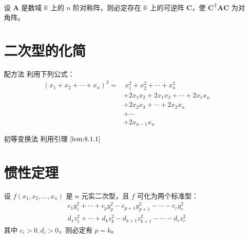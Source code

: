 \begin{theorem}
    设 $\bm{A}$ 是数域 $\mathbb{K}$ 上的 $n$ 阶对称阵，则必定存在 $\mathbb{K}$ 上的可逆阵 $\bm{C}$，使 $\bm{C}^{\mathrm{T}}\bm{AC}$ 为对角阵。
\end{theorem}



\section{二次型的化简}

\begin{proposition}{配方法}
    利用下列公式：
    \begin{align*}
        (x_1 + x_2 + \cdots + x_n)^2 = & \ x_{1}^{2} + x_{2}^{2} + \cdots + x_{n}^{2}       \\
                                       & + 2x_{1}x_{2} + 2x_{1}x_{3} + \cdots + 2x_{1}x_{n} \\
                                       & + 2x_{2}x_{3} + \cdots + 2x_{2}x_{n}               \\
                                       & + \cdots                                           \\
                                       & + 2x_{n - 1}x_{n}
    \end{align*}
\end{proposition}

\begin{proposition}{初等变换法}
    利用引理 $\ref{lem:8.1.1}$
\end{proposition}






\section{惯性定理}

\begin{definition}
    设 $f(x_1, x_2, \ldots, x_n)$ 是 $n$ 元实二次型，且 $f$ 可化为两个标准型：
    \begin{align*}
        c_{1}y_{1}^{2} + \cdots + c_{p}y_{p}^{2} - c_{p + 1}y_{p + 1}^{2} - \cdots - c_{r}y_{r}^{2} \\
        d_{1}z_{1}^{2} + \cdots + d_{k}z_{k}^{2} - d_{k + 1}z_{k + 1}^{2} - \cdots - d_{r}z_{r}^{2}
    \end{align*}
    其中 $c_{i} > 0, d_{i} > 0$，则必定有 $p = k$。
\end{definition}


